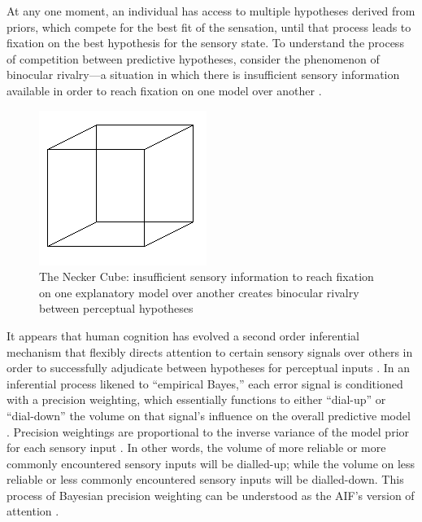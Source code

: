\begin{CJK}{UTF8}{gbsn}
At any one moment, an individual has access to multiple hypotheses derived from priors, which compete for the best fit of the sensation, until that process leads to fixation on the best hypothesis for the sensory state.  To understand the process of competition between predictive hypotheses, consider the phenomenon of binocular rivalry---a situation in which there is insufficient sensory information available in order to reach fixation on one model over another \citep[for example, looking at a necker cube, see Figure ~\ref{fig:neckerCube}][]{Frith2007}.

\begin{figure}[htbp]
  \begin{center}
    \includegraphics[scale=.7]{images/Necker_cube.png}
      \caption{The Necker Cube: insufficient sensory information to reach fixation on one explanatory model over another creates binocular rivalry between perceptual hypotheses}
        \label{fig:neckerCube}
   \end{center}
\end{figure}

It appears that human cognition has evolved a second order inferential mechanism that flexibly directs attention to certain sensory signals over others in order to successfully adjudicate between hypotheses for perceptual inputs \citep{Clark2013}.  In an inferential process likened to ``empirical Bayes,'' each error signal is conditioned with a precision weighting, which essentially functions to either ``dial-up'' or ``dial-down'' the volume on that signal's influence on the overall predictive model \citep{Clark2015}.  Precision weightings are proportional to the inverse variance of the model prior for each sensory input \citep{Ernst2004,FitzGerald2014}.  In other words, the volume of more reliable or more commonly encountered sensory inputs will be dialled-up; while the volume on less reliable or less commonly encountered sensory inputs will be dialled-down. This process of Bayesian precision weighting can be understood as the AIF's version of attention \citep{Ramstead2016}.


\end{CJK}
